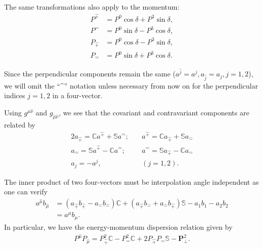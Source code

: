 \documentclass[12pt,a4paper]{report}
\newcommand{\Cc}{\mathbb{C}}
\newcommand{\Ss}{\mathbb{S}}
\newcommand{\pT}{\hat{+}}
\newcommand{\mT}{\hat{-}}
\newcommand{\muT}{\hat{\mu}}
\newcommand{\nuT}{\hat{\nu}}
\newcommand{\itP}[1]{\hat{#1}}
\begin{document}
The same transformations also apply to the momentum:\cite{gauge}
\begin{subequations}
  \label{eqn:P_interpolation}
  \begin{align}
    P^{\pT}&=P^{0}\cos\delta + P^{3}\sin\delta,\label{eqn:P_interpolation_1}\\
    P^{\mT}&=P^{0}\sin\delta - P^{3}\cos\delta,\label{eqn:P_interpolation_2}\\
    P_{\pT}&=P^{0}\cos\delta - P^{3}\sin\delta,\label{eqn:P_interpolation_3}\\
    P_{\mT}&=P^{0}\sin\delta + P^{3}\cos\delta.\label{eqn:P_interpolation_4}
  \end{align}
\end{subequations}

Since the perpendicular components remain the same ($a^{\itP{j}}=a^{j},a_{\itP{j}}=a_{j}, j=1,2$), we will omit the ``\textasciicircum''  notation unless necessary from now on for the perpendicular indices $j=1,2$ in a four-vector.

Using $g^{\muT\nuT}$ and $g_{\muT\nuT}$, we see that the covariant and contravariant components are related by
\begin{alignat}{2}
  a_{\pT}=\Cc a^{\pT}+\Ss a^{\mT}; &\quad a^{\pT}=\Cc a_{\pT}+\Ss a_{\mT} \label{eqn:relation_between_covariant_and_contravariant_components_with_any_interpolation}\\
  a_{\mT}=\Ss a^{\pT}-\Cc a^{\mT}; &\quad a^{\mT}=\Ss a_{\pT}-\Cc a_{\mT} \nonumber\\
  a_{j}=-a^{j},&\quad (j=1,2) \nonumber.
\end{alignat}

The inner product of two four-vectors must be interpolation angle independent as
one can verify
\begin{align}\label{eqn:inner_product_of_four_vectors_interpolation_angle}
  a^{\muT}b_{\muT}&=(a_{\pT}b_{\pT}-a_{\mT}b_{\mT})\Cc+(a_{\pT}b_{\mT}+a_{\mT}b_{\pT})\Ss-a_{1}b_{1}-a_{2}b_{2}\nonumber\\
  &=a^{\mu}b_{\mu}.
\end{align}
In particular, we have the energy-momentum dispersion relation given by
\begin{align}\label{eqn:on_mass_shell_4_momentum_inner_product}
  P^{\muT}P_{\muT}=P_{\pT}^{2}\Cc-P_{\mT}^{2}\Cc+2P_{\pT}P_{\mT}\Ss-\mathbf{P}_{\perp}^{2}.
\end{align}

	
\end{document}
